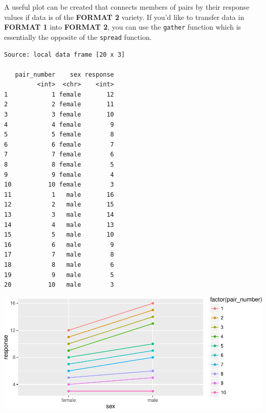 \documentclass[twoside, 12pt]{article}
\newenvironment{Shaded}{\begin{snugshade}}{\end{snugshade}}
\newcommand{\KeywordTok}[1]{\textcolor[rgb]{0.13,0.29,0.53}{\textbf{{#1}}}}
\newcommand{\DataTypeTok}[1]{\textcolor[rgb]{0.13,0.29,0.53}{{#1}}}
\newcommand{\StringTok}[1]{\textcolor[rgb]{0.31,0.60,0.02}{{#1}}}
\newcommand{\NormalTok}[1]{{#1}}
\begin{document}
A useful plot can be created that connects members of pairs by their
response values if data is of the \textbf{FORMAT 2} variety. If you'd
like to transfer data in \textbf{FORMAT 1} into \textbf{FORMAT 2}, you
can use the \texttt{gather} function which is essentially the opposite
of the \texttt{spread} function.

\begin{Shaded}
\end{Shaded}

\begin{Verbatim}[frame=single]
Source: local data frame [20 x 3]

   pair_number    sex response
         <int>  <chr>    <int>
1            1 female       12
2            2 female       11
3            3 female       10
4            4 female        9
5            5 female        8
6            6 female        7
7            7 female        6
8            8 female        5
9            9 female        4
10          10 female        3
11           1   male       16
12           2   male       15
13           3   male       14
14           4   male       13
15           5   male       10
16           6   male        9
17           7   male        8
18           8   male        6
19           9   male        5
20          10   male        3
\end{Verbatim}

\begin{Shaded}
\end{Shaded}

\includegraphics{skeleton_files/figure-latex/unnamed-chunk-64-1.pdf}
\end{document}
